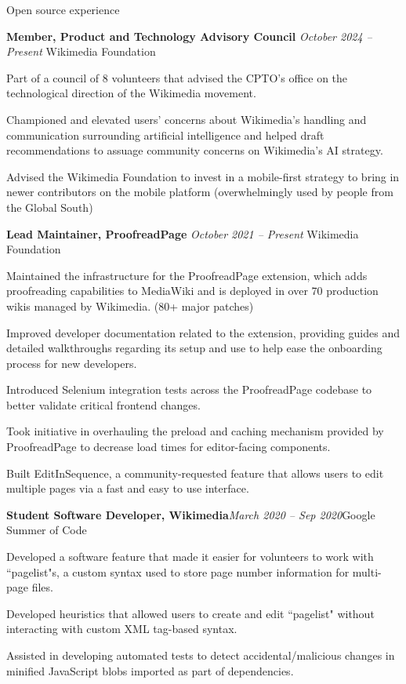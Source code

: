 \documentclass{resume} %
\begin{document}
\begin{rSection}{Open source experience}
\begin{rSubsection}{ \bf Member, Product and Technology Advisory Council}{ \em October 2024 -- Present }{Wikimedia Foundation}{}
\item Part of a council of 8 volunteers that advised the CPTO's office on the technological direction of the Wikimedia movement.
\item Championed and elevated users' concerns about Wikimedia's handling and communication surrounding artificial intelligence and helped draft recommendations to assuage community concerns on Wikimedia's AI strategy.
\item Advised the Wikimedia Foundation to invest in a mobile-first strategy to bring in newer contributors on the mobile platform (overwhelmingly used by people from the Global South)
\end{rSubsection}
\begin{rSubsection}{ \bf Lead Maintainer, ProofreadPage}{ \em October 2021 -- Present }{Wikimedia Foundation}{}
\item Maintained the infrastructure for the ProofreadPage extension, which adds proofreading capabilities to MediaWiki and is deployed in over 70 production wikis managed by Wikimedia. (80+ major patches)
\item Improved developer documentation related to the extension, providing guides and detailed walkthroughs regarding its setup and use to help ease the onboarding process for new developers.
\item Introduced Selenium integration tests across the ProofreadPage codebase to better validate critical frontend changes.
\item Took initiative in overhauling the preload and caching mechanism provided by ProofreadPage to decrease load times for editor-facing components.
\item Built EditInSequence, a community-requested feature that allows users to edit multiple pages via a fast and easy to use interface.
\end{rSubsection}
%
\begin{rSubsection}{ \bf Student Software Developer, Wikimedia}{\em March 2020 -- Sep 2020}{Google Summer of Code}{}
\item Developed a software feature that made it easier for volunteers to work with ``pagelist"s, a custom syntax used to store page number information for multi-page files.
\item Developed heuristics that allowed users to create and edit ``pagelist" without interacting with custom XML tag-based syntax.
\item Assisted in developing automated tests to detect accidental/malicious changes in minified JavaScript blobs imported as part of dependencies.
\end{rSubsection}
\end{rSection}
\end{document}
